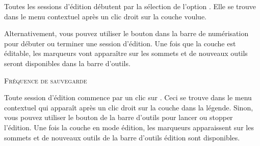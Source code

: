 \begin{itemize}

Toutes les sessions d'édition débutent par la sélection de l'option . Elle se trouve dans le menu contextuel après un clic droit sur la couche voulue.


Alternativement, vous pouvez utiliser le bouton  dans la barre de numérisation pour débuter ou terminer une session d'édition. Une fois que la couche est éditable, les marqueurs vont apparaître sur les sommets et de nouveaux outils seront disponibles dans la barre d'outils.

\begin{Astuce}[ht]\caption{\textsc{Fréquence de sauvegarde}}
\end{Astuce}

Toute session d'édition commence par un clic sur . Ceci se trouve dans le menu contextuel qui apparaît après un clic droit sur la couche dans la légende. Sinon, vous pouvez utiliser le bouton   de la barre d'outils pour lancer ou stopper l'édition.  Une fois la couche en mode édition, les marqueurs apparaissent sur les sommets et de nouveaux outils de la barre d'outils édition sont disponibles.


\end{itemize}
